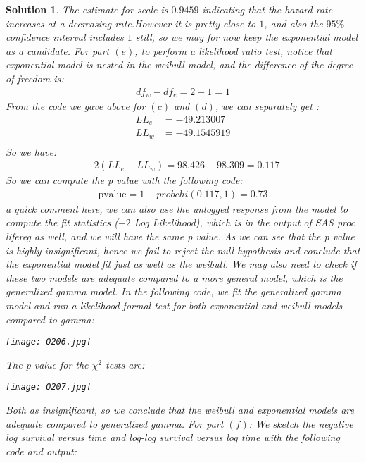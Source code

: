 \documentclass[11pt]{article}
\newtheorem{sol}{Solution}
\begin{document}
\begin{sol}
	The estimate for scale is $0.9459$ indicating that the hazard rate increases at a decreasing rate.However it is pretty close to $1$, and also the $95\%$ confidence interval includes $1$ still, so we may for now keep the exponential model as a candidate.\vskip 2mm
	 For part $(e)$, to perform a likelihood ratio test, notice that exponential model is nested in the weibull model, and the difference of the degree of freedom is:
	 \begin{align*}
	 	df_w - df_e = 2 - 1 = 1
	 \end{align*}
	 From the code we gave above for $(c)$ and $(d)$, we can separately get :
	 \begin{align*}
	 	LL_e &= -49.213007\\
	 	LL_w &= -49.1545919\\ 
	 \end{align*}
	 So we have:
	 \begin{align*}
	 	-2(LL_e - LL_w) = 98.426 - 98.309 = 0.117
	 \end{align*}
	 So we can compute the p value with the following code:
	 \begin{align*}
	 	\text{pvalue} = 1 - probchi(0.117, 1) = 0.73
	 \end{align*}
	 a quick comment here, we can also use the unlogged response from the model to compute the fit statistics ($-2$ Log Likelihood), which is in the output of SAS proc lifereg as well, and we will have the same p value.\vskip 2mm
	 As we can see that the p value is highly insignificant, hence we fail to reject the null hypothesis and conclude that the exponential model fit just as well as the weibull.\vskip 2mm
	 We may also need to check if these two models are adequate compared to a more general model, which is the generalized gamma model. In the following code, we fit the generalized gamma model and run a likelihood formal test for both exponential and weibull models compared to gamma:
	 \begin{center}
		\texttt{[image: Q206.jpg]}
	\end{center}
	The p value for the $\chi^2$ tests are:
	\begin{center}
		\texttt{[image: Q207.jpg]}
	\end{center}
	Both as insignificant, so we conclude that the weibull and exponential models are adequate compared to generalized gamma.\vskip 2mm
	 For part $(f)$:\vskip 2mm
	 We sketch the negative log survival versus time and log-log survival versus log time with the following code and output:
	   \begin{center}

\end{center}
\end{sol}
\end{document}
